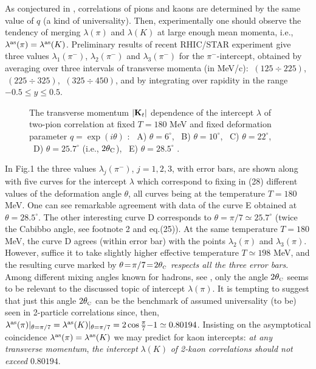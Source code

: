 \documentclass[twoside]{article}
\newcommand{\scr}{\rm\scriptscriptstyle}
\begin{document}
As conjectured in \cite{AGI2}, correlations of pions and kaons are
determined by the same value of $q$ (a kind of universality).
Then, experimentally one should observe the tendency of merging
$\lambda(\pi)$ and $\lambda(K)$ at large enough mean momenta, i.e.,
$\lambda^{\rm as}(\pi)=\lambda^{\rm as}(K)$. Preliminary results
of recent RHIC/STAR experiment give three values   \cite{laue}
$\lambda_1(\pi^-)$, $\lambda_2(\pi^-)$ and $\lambda_3(\pi^-)$ for
the $\pi^-$-intercept, obtained by averaging over three intervals of
transverse momenta (in MeV/c):  $\ (125 \div 225)$, $\ (225 \div 325)$,
$\ (325 \div 450)$, and by integrating over rapidity in the range
$-0.5 \le y \le 0.5$.


  \begin{figure}[t]
\begin{center}
\vspace{-0.01cm}
\hspace{-2mm}   {
      }
\vspace{-0.6cm}
\caption  { The transverse momentum $|{\bf K}_t|$ dependence of the
intercept $\lambda $ of two-pion correlation at fixed $T=180$ MeV
and fixed deformation parameter $q=\exp(i\theta)$ :
 \  A) $\theta = 6^\circ$,  \ B) $\theta = 10^\circ$,
 \  C) $\theta = 22^\circ$,
 \  D) $\theta =  25.7^\circ$ (i.e., $2 \theta_{\rm C}$),
 \  E) $\theta = 28.5^\circ$ .}
\vspace{-1.5cm}
\end{center}
\end{figure}

In Fig.1 the three values $\lambda_j(\pi^-)$, $j{=}1,2,3$,
with error bars, are shown along with five curves
for the intercept $\lambda$ which correspond to fixing in (28)
different values of the deformation angle $\theta$,
all curves being at the temperature $T=180$ MeV.  One can see
remarkable agreement with data of the curve E obtained at
$\theta=28.5^{\circ}$. The other interesting curve D corresponds
to $\theta=\pi/7\simeq 25.7^{\circ}$ (twice the Cabibbo angle,
see footnote 2 and eq.(25)). At the same temperature $T=180$ MeV,
the curve D agrees (within error bar) with the points $\lambda_2(\pi)$
and $\lambda_3(\pi)$. However, suffice it to take slightly higher
effective temperature $T\simeq 198$ MeV, and the resulting curve
marked by $\theta\!=\!\pi/7\!=\!2\theta_{\scr{C}}$
{\it respects all the three error bars}. Among different
mixing angles known for hadrons, see \cite{PDG}, only the angle
$2\theta_{\scr{C}}$ seems to be relevant to the discussed topic of
intercept $\lambda(\pi)$. It is tempting to suggest that
just this angle $2\theta_{\scr{C}}$ can be the benchmark of
assumed universality (to be) seen in 2-particle correlations
since, then, $\lambda^{\rm as}(\pi)\vert_{\theta=\pi/7}=
\lambda^{\rm as}(K)\vert_{\theta=\pi/7}=
2\cos\frac{\pi}{7}{-}1\simeq0.80194$.
Insisting on the asymptotical coincidence
$\lambda^{\rm as}(\pi)=\lambda^{\rm as}(K)$
we may predict for kaon intercepts:
{\it at any transverse momentum}, {\it the intercept} $\lambda(K)$
{\it of 2-kaon correlations should not exceed} $0.80194$.
\end{document}

